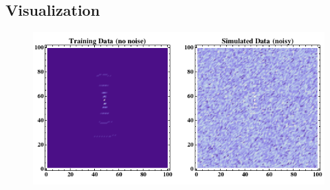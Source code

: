 \subsection{Visualization}

\begin{figure}
  \centering
  \includegraphics[scale=0.7]{ccd2D.png}
\end{figure}

